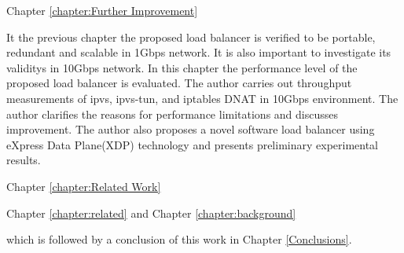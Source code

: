 Chapter \ref{chapter:Further Improvement} 

It the previous chapter the proposed load balancer is verified to be portable, redundant and scalable in 1Gbps network.
It is also important to investigate its validitys in 10Gbps network.
In this chapter the performance level of the proposed load balancer is evaluated.
The author carries out throughput measurements of ipvs, ipvs-tun, and iptables DNAT in 10Gbps environment.
The author clarifies the reasons for performance limitations and discusses improvement.
The author also proposes a novel software load balancer using eXpress Data Plane(XDP) technology and presents preliminary experimental results.

Chapter \ref{chapter:Related Work}


Chapter \ref{chapter:related} and Chapter \ref{chapter:background} 

which is followed by a conclusion of this work in Chapter \ref{Conclusions}.



